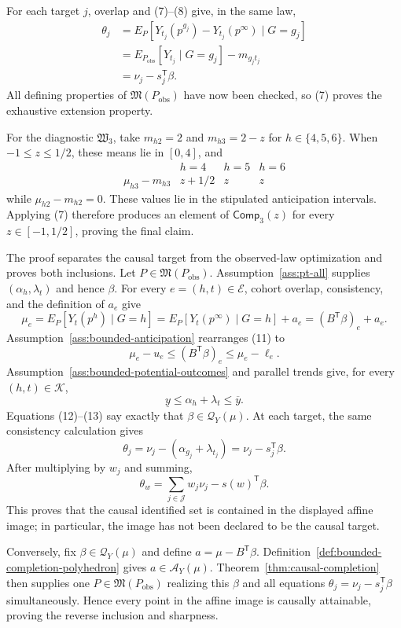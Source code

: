For each target \(j\), overlap and (7)--(8) give, in the same law,
\[
 \begin{aligned}
 \theta_j
 &=E_P[Y_{t_j}(p^{g_j})-Y_{t_j}(p^\infty)\mid G=g_j]\\
 &=E_{P_{\mathrm{obs}}}[Y_{t_j}\mid G=g_j]-m_{g_jt_j}\\
 &=\nu_j-s_j^{\mathsf T}\beta.
 \end{aligned} \tag{10}
\]
All defining properties of \(\mathfrak M(P_{\mathrm{obs}})\) have now been checked, so (7) proves the exhaustive extension property.

For the diagnostic \(\mathfrak W_3\), take \(m_{h2}=2\) and \(m_{h3}=2-z\) for \(h\in\{4,5,6\}\).  When \(-1\le z\le1/2\), these means lie in \([0,4]\), and
\[
 \begin{array}{c|ccc}
 &h=4&h=5&h=6\\ \hline
 \mu_{h3}-m_{h3}&z+1/2&z&z
 \end{array}
\]
while \(\mu_{h2}-m_{h2}=0\).  These values lie in the stipulated anticipation intervals.  Applying (7) therefore produces an element of \(\mathsf{Comp}_3(z)\) for every \(z\in[-1,1/2]\), proving the final claim.

The proof separates the causal target from the observed-law optimization and proves both inclusions.  Let \(P\in\mathfrak M(P_{\mathrm{obs}})\).  Assumption~\ref{ass:pt-all} supplies \((\alpha_h,\lambda_t)\) and hence \(\beta\).  For every \(e=(h,t)\in\mathcal E\), cohort overlap, consistency, and the definition of \(a_e\) give
\[
 \mu_e=E_P[Y_t(p^h)\mid G=h]
 =E_P[Y_t(p^\infty)\mid G=h]+a_e
 =(B^{\mathsf T}\beta)_e+a_e. \tag{11}
\]
Assumption~\ref{ass:bounded-anticipation} rearranges (11) to
\[
 \mu_e-u_e\le(B^{\mathsf T}\beta)_e\le\mu_e-\ell_e. \tag{12}
\]
Assumption~\ref{ass:bounded-potential-outcomes} and parallel trends give, for every \((h,t)\in\mathcal K\),
\[
 \underline y\le\alpha_h+\lambda_t\le\overline y. \tag{13}
\]
Equations (12)--(13) say exactly that \(\beta\in\mathcal Q_Y(\mu)\).  At each target, the same consistency calculation gives
\[
 \theta_j=\nu_j-(\alpha_{g_j}+\lambda_{t_j})
 =\nu_j-s_j^{\mathsf T}\beta.
\]
After multiplying by \(w_j\) and summing,
\[
 \theta_w=\sum_{j\in\mathcal J}w_j\nu_j-s(w)^{\mathsf T}\beta. \tag{14}
\]
This proves that the causal identified set is contained in the displayed affine image; in particular, the image has not been declared to be the causal target.

Conversely, fix \(\beta\in\mathcal Q_Y(\mu)\) and define \(a=\mu-B^{\mathsf T}\beta\).  Definition~\ref{def:bounded-completion-polyhedron} gives \(a\in\mathcal A_Y(\mu)\).  Theorem~\ref{thm:causal-completion} then supplies one \(P\in\mathfrak M(P_{\mathrm{obs}})\) realizing this \(\beta\) and all equations \(\theta_j=\nu_j-s_j^{\mathsf T}\beta\) simultaneously.  Hence every point in the affine image is causally attainable, proving the reverse inclusion and sharpness.

